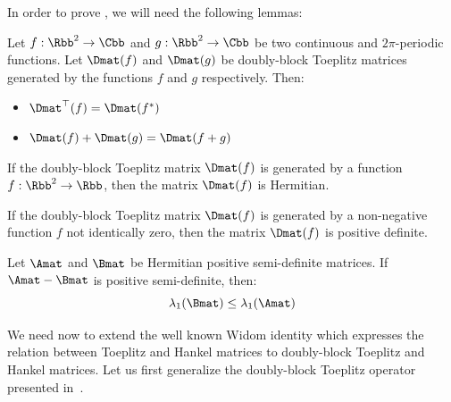 \noindent
In order to prove , we will need the following lemmas:

\begin{lemma} \label{theorem:properties_block_toeplitz}
  Let $f:\Rbb^2 \rightarrow \Cbb$ and $g:\Rbb^2 \rightarrow \Cbb$ be two continuous and $2\pi$-periodic functions. Let $\Dmat(f)$ and $\Dmat(g)$ be doubly-block Toeplitz matrices generated by the functions $f$ and $g$ respectively.
  Then:
  \begin{itemize}
      \item $\Dmat^\top(f) = \Dmat(f^*)$
      \item $\Dmat(f) + \Dmat(g) = \Dmat(f + g)$
  \end{itemize}
  \removespace
\end{lemma}

\begin{lemma} \label{theorem:block_toeplitz_hermitian}
  If the doubly-block Toeplitz matrix $\Dmat(f)$ is generated by a function $f: \Rbb^2 \rightarrow \Rbb$, then the matrix $\Dmat(f)$ is Hermitian. 
\end{lemma}

\begin{lemma} \label{theorem:block_toeplitz_positive_definite}
  If the doubly-block Toeplitz matrix $\Dmat(f)$ is generated by a non-negative function $f$ not identically zero, then the matrix $\Dmat(f)$ is positive definite. 
\end{lemma}

\begin{lemma} \label{theorem:diff_positive_semidefinite_matrices}
Let $\Amat$ and $\Bmat$ be Hermitian positive semi-definite matrices. If $\Amat - \Bmat$ is positive semi-definite, then:
  \begin{equation}
      \lambda_1 \left( \Bmat \right) \leq \lambda_1 \left( \Amat \right)
  \end{equation}
  \removespace
\end{lemma}


We need now to extend the well known Widom identity \cite{widom1976asymptotic} which expresses the relation between Toeplitz and Hankel matrices to doubly-block Toeplitz and Hankel matrices.
Let us first generalize the doubly-block Toeplitz operator presented in~.

